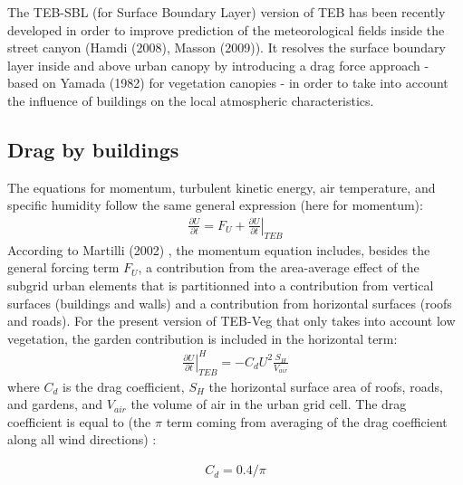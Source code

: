 The TEB-SBL (for Surface Boundary Layer) version of TEB has been recently developed 
in order to improve prediction of the meteorological fields inside the street canyon 
(Hamdi \etal (2008), Masson \etal (2009))\nocite{Hamdi2008}\nocite{Masson2009}.
It resolves the surface boundary layer inside and above urban canopy by introducing 
a drag force approach - based on Yamada (1982) \nocite{yamada82}
for vegetation canopies - in order to take into account the influence of buildings 
on the local atmospheric characteristics.
\\

\subsection{Drag by buildings}

The equations for momentum, turbulent kinetic energy, air temperature, and specific 
humidity follow the same general expression (here for momentum):
{\footnotesize
\begin{eqnarray}
\frac{\partial U}{\partial t} = F_U + \left. \frac{\partial U}{\partial t} \right|_{TEB}
\end{eqnarray}
}
According to Martilli (2002) \nocite{Martilli2002} 
, the momentum equation includes, besides the general forcing term $F_U$, a contribution 
from the area-average effect of the subgrid urban elements that is partitionned into a 
contribution from vertical surfaces (buildings and walls) and a contribution from horizontal 
surfaces (roofs and roads). For the present version of TEB-Veg that only takes into account 
low vegetation, the garden contribution is included in the horizontal term:
{\footnotesize
\begin{eqnarray}
\left. \frac{\partial U}{\partial t} \right|^H_{TEB} = - C_d U^2 \frac{S_H}{V_{air}}
\end{eqnarray}
}
where $C_d$ is the drag coefficient, $S_H$ the horizontal surface area of roofs, roads, 
and gardens, and $V_{air}$ the volume of air in the urban grid cell. The drag coefficient 
is equal to (the $\pi$ term coming from averaging of the drag coefficient along all wind directions) :

\begin{eqnarray}
C_d =  0.4 / \pi
\end{eqnarray}


